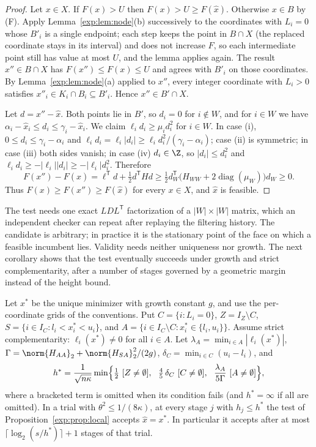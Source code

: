 \begin{proof}
Let $x\in X$. If $F(x)>U$ then $F(x)>U\ge F(\hat x)$. Otherwise $x\in B$ by
(F). Apply Lemma~\ref{exp:lem:node}(b) successively to the coordinates with
$L_i=0$ whose $B'_i$ is a single endpoint; each step keeps the point in
$B\cap X$ (the replaced coordinate stays in its interval) and does not
increase $F$, so each intermediate point still has value at most $U$, and the
lemma applies again. The result $x''\in B\cap X$ has $F(x'')\le F(x)\le U$
and agrees with $B'_i$ on those coordinates. By Lemma~\ref{exp:lem:node}(a)
applied to $x''$, every integer coordinate with $L_i>0$ satisfies
$x''_i\in K_i\cap B_i\subseteq B'_i$. Hence $x''\in B'\cap X$.

Let $d=x''-\hat x$. Both points lie in $B'$, so $d_i=0$ for $i\notin W$, and
for $i\in W$ we have $\alpha_i-\hat x_i\le d_i\le\gamma_i-\hat x_i$. We
claim $\ell_id_i\ge\mu_id_i^2$ for $i\in W$. In case (i),
$0\le d_i\le\gamma_i-\alpha_i$ and $\ell_id_i=\ell_i|d_i|\ge
\ell_id_i^2/(\gamma_i-\alpha_i)$; case (ii) is symmetric; in case (iii) both
sides vanish; in case (iv) $d_i\in\Z$, so $|d_i|\le d_i^2$ and
$\ell_id_i\ge-|\ell_i||d_i|\ge-|\ell_i|d_i^2$. Therefore
\[
F(x'')-F(\hat x)=\ell^{\mathsf T}d+\tfrac12d^{\mathsf T}Hd\ge
\tfrac12d_W^{\mathsf T}\bigl(H_{WW}+2\operatorname{diag}(\mu_W)\bigr)d_W\ge0 .
\]
Thus $F(x)\ge F(x'')\ge F(\hat x)$ for every $x\in X$, and $\hat x$ is
feasible.
\end{proof}

The test needs one exact $LDL^{\mathsf T}$ factorization of a $|W|\times|W|$
matrix, which an independent checker can repeat after replaying the
filtering history. The candidate is arbitrary; in practice it is the
stationary point of the face on which a feasible incumbent lies. Validity
needs neither uniqueness nor growth. The next corollary shows that the test
eventually succeeds under growth and strict complementarity, after a number of
stages governed by a geometric margin instead of the height bound.

\begin{corollary}\label{exp:cor:eventual}
Let $x^*$ be the unique minimizer with growth constant $g$, and use the
per-coordinate grids of the conventions. Put $C=\{i:L_i=0\}$,
$Z=I_Z\setminus C$, $S=\{i\in I_C:l_i<x^*_i<u_i\}$, and
$A=\{i\in I_C\setminus C:x^*_i\in\{l_i,u_i\}\}$. Assume strict
complementarity: $\ell_i(x^*)\ne0$ for all $i\in A$. Let
$\lambda_A=\min_{i\in A}|\ell_i(x^*)|$,
$\Gamma=\norm{H_{AA}}_2+\norm{H_{SA}}_2^2/(2g)$,
$\delta_C=\min_{i\in C}(u_i-l_i)$, and
\[
h^*=\frac1{\sqrt{n\kappa}}\min\Bigl\{\tfrac12\ [Z\ne\emptyset],\ \
\tfrac45\,\delta_C\ [C\ne\emptyset],\ \ \frac{\lambda_A}{5\Gamma}\
[A\ne\emptyset]\Bigr\},
\]
where a bracketed term is omitted when its condition fails (and
$h^*=\infty$ if all are omitted). In a trial with $\theta^2\le1/(8\kappa)$,
at every stage $j$ with $h_j\le h^*$ the test of
Proposition~\ref{exp:prop:local} accepts $\hat x=x^*$. In particular it
accepts after at most $\lceil\log_2(s/h^*)\rceil+1$ stages of that trial.
\end{corollary}

